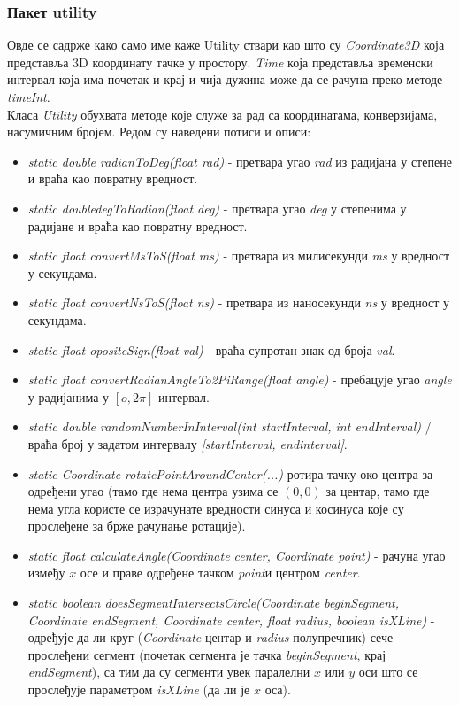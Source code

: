 \subsubsection{Пакет utility}

Овде се садрже како само име каже Utility ствари као што су \emph{Coordinate3D} која представља 3D координату тачке у простору. \emph{Time} која представља временски интервал која има почетак и крај и чија дужина може да се рачуна преко методе \emph{timeInt}.  
\\ \indent 
Класа \emph{Utility} обухвата методе које служе за рад са координатама, конверзијама, насумичним бројем. Редом су наведени потиси и описи:
\begin{itemize}
\item \emph{static double radianToDeg(float rad)} - претвара угао \emph{rad} из радијана у степене и враћа као повратну вредност.
\item \emph{static doubledegToRadian(float deg)} -  претвара угао \emph{deg} у степенима у радијане и враћа као повратну вредност.
\item \emph{static float convertMsToS(float ms)} - претвара из милисекунди \emph{ms} у вредност у секундама. 
\item \emph{static float convertNsToS(float ns)} - претвара из наносекунди \emph{ns} у вредност у секундама.
\item \emph{static float opositeSign(float val)} - враћа супротан знак од броја \emph{val}.
\item \emph{static float convertRadianAngleTo2PiRange(float angle)} - пребацује угао \emph{angle} у радијанима у $\left[ o, 2 \pi \right]$ интервал.
\item \emph{static double randomNumberInInterval(int startInterval, int endInterval)} / враћа број у задатом интервалу \emph{[startInterval, endinterval]}.
\item \emph{static Coordinate rotatePointAroundCenter(...)}-ротира тачку око центра за одређени угао (тамо где нема центра узима се $(0, 0)$ за центар, тамо где нема угла користе се израчунате вредности синуса и косинуса које су прослеђене за брже рачунање ротације).
\item \emph{static float calculateAngle(Coordinate center, Coordinate point)} -  рачуна угао између $x$ осе и праве одређене тачком  \emph{point}и центром \emph{center}.
\item \emph{static boolean doesSegmentIntersectsCircle(Coordinate beginSegment, Coordinate endSegment, Coordinate center, float radius, boolean isXLine)} - одређује да ли круг (\emph{Coordinate} центар и \emph{radius} полупречник) сече прослеђени сегмент (почетак сегмента је тачка \emph{beginSegment}, крај \emph{endSegment}), са тим да су сегменти увек паралелни $x$ или $y$ оси што се прослеђује параметром \emph{isXLine} (да ли је $x$ оса). 

\end{itemize}
